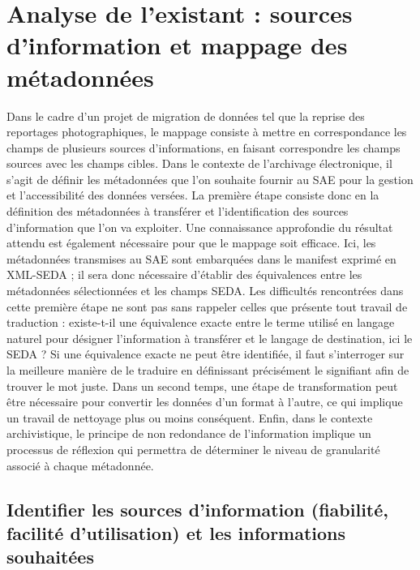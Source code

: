 \chapter{Analyse de l'existant : sources d'information et mappage des métadonnées}

Dans le cadre d'un projet de migration de données tel que la reprise des reportages photographiques, le mappage consiste à mettre en correspondance les champs de plusieurs sources d'informations, en faisant correspondre les champs sources avec les champs cibles. Dans le contexte de l'archivage électronique, il s'agit de définir les métadonnées que l'on souhaite fournir au SAE pour la gestion et l'accessibilité des données versées. La première étape consiste donc en la définition des métadonnées à transférer et l'identification des sources d'information que l'on va exploiter. Une connaissance approfondie du résultat attendu est également nécessaire pour que le mappage soit efficace. Ici, les métadonnées transmises au SAE sont embarquées dans le manifest exprimé en XML-SEDA ; il sera donc nécessaire d'établir des équivalences entre les métadonnées sélectionnées et les champs SEDA. Les difficultés rencontrées dans cette première étape ne sont pas sans rappeler celles que présente tout travail de traduction : existe-t-il une équivalence exacte entre le terme utilisé en langage naturel pour désigner l'information à transférer et le langage de destination, ici le SEDA ? Si une équivalence exacte ne peut être identifiée, il faut s'interroger sur la meilleure manière de le traduire en définissant précisément le signifiant afin de trouver le mot juste. Dans un second temps, une étape de transformation peut être nécessaire pour convertir les données d'un format à l'autre, ce qui implique un travail de nettoyage plus ou moins conséquent. Enfin, dans le contexte archivistique, le principe de non redondance de l'information implique un processus de réflexion qui permettra de déterminer le niveau de granularité associé à chaque métadonnée.

\section{Identifier les sources d'information (fiabilité, facilité d'utilisation) et les informations souhaitées}
